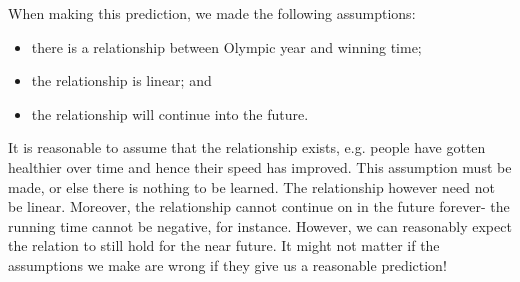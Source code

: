 \documentclass[a4paper, openany]{memoir}
\begin{document}
    When making this prediction, we made the following assumptions:
    \begin{itemize}
        \item there is a relationship between Olympic year and winning time;
        \item the relationship is linear; and
        \item the relationship will continue into the future.
    \end{itemize}
    It is reasonable to assume that the relationship exists, e.g. people have gotten healthier over time and hence their speed has improved. This assumption must be made, or else there is nothing to be learned. The relationship however need not be linear. Moreover, the relationship cannot continue on in the future forever- the running time cannot be negative, for instance. However, we can reasonably expect the relation to still hold for the near future. It might not matter if the assumptions we make are wrong if they give us a reasonable prediction!
\end{document}
